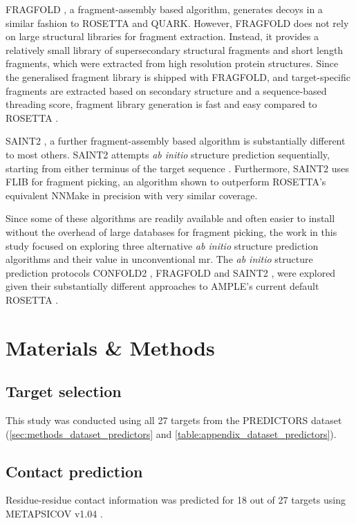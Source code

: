 FRAGFOLD \cite{Jones2001-mc}, a fragment-assembly based algorithm, generates decoys in a similar fashion to ROSETTA and QUARK. However, FRAGFOLD does not rely on large structural libraries for fragment extraction. Instead, it provides a relatively small library of supersecondary structural fragments and short length fragments, which were extracted from high resolution protein structures. Since the generalised fragment library is shipped with FRAGFOLD, and target-specific fragments are extracted based on secondary structure and a sequence-based threading score, fragment library generation is fast and easy compared to ROSETTA \cite{Kosciolek2014-bt}.

SAINT2 \cite{De_Oliveira2017-sg}, a further fragment-assembly based algorithm is substantially different to most others. SAINT2 attempts \textit{ab initio} structure prediction sequentially, starting from either terminus of the target sequence \cite{De_Oliveira2017-sg}. Furthermore, SAINT2 uses FLIB \cite{De_Oliveira2015-kb} for fragment picking, an algorithm shown to outperform ROSETTA's equivalent NNMake \cite{Gront2011-sv} in precision with very similar coverage.

Since some of these algorithms are readily available and often easier to install without the overhead of large databases for fragment picking, the work in this study focused on exploring three alternative \textit{ab initio} structure prediction algorithms and their value in unconventional \gls{mr}. The \textit{ab initio} structure prediction protocols CONFOLD2 \cite{Adhikari2018-lj}, FRAGFOLD \cite{Jones2001-mc} and SAINT2 \cite{De_Oliveira2017-sg}, were explored given their substantially different approaches to AMPLE's current default ROSETTA \cite{Rohl2004-dj}.

\section{Materials \& Methods}
\subsection{Target selection}
This study was conducted using all 27 targets from the PREDICTORS dataset (\cref{sec:methods_dataset_predictors} and \cref{table:appendix_dataset_predictors}).

\subsection{Contact prediction}
Residue-residue contact information was predicted for 18 out of 27 targets using METAPSICOV v1.04 \cite{Jones2015-vq}.

